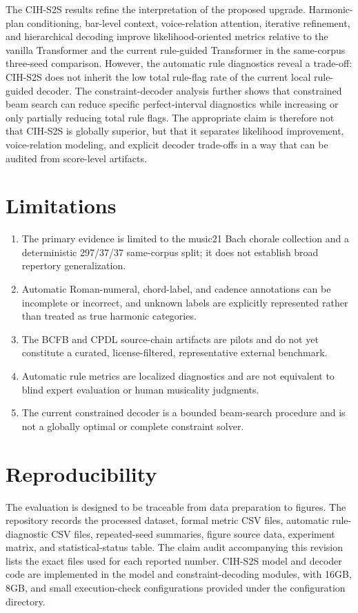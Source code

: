 \documentclass[11pt]{article}
\begin{document}
The CIH-S2S results refine the interpretation of the proposed upgrade. Harmonic-plan conditioning, bar-level context, voice-relation attention, iterative refinement, and hierarchical decoding improve likelihood-oriented metrics relative to the vanilla Transformer and the current rule-guided Transformer in the same-corpus three-seed comparison. However, the automatic rule diagnostics reveal a trade-off: CIH-S2S does not inherit the low total rule-flag rate of the current local rule-guided decoder. The constraint-decoder analysis further shows that constrained beam search can reduce specific perfect-interval diagnostics while increasing or only partially reducing total rule flags. The appropriate claim is therefore not that CIH-S2S is globally superior, but that it separates likelihood improvement, voice-relation modeling, and explicit decoder trade-offs in a way that can be audited from score-level artifacts.

\section{Limitations}

\begin{enumerate}
\item The primary evidence is limited to the music21 Bach chorale collection and a deterministic 297/37/37 same-corpus split; it does not establish broad repertory generalization.
\item Automatic Roman-numeral, chord-label, and cadence annotations can be incomplete or incorrect, and unknown labels are explicitly represented rather than treated as true harmonic categories.
\item The BCFB and CPDL source-chain artifacts are pilots and do not yet constitute a curated, license-filtered, representative external benchmark.
\item Automatic rule metrics are localized diagnostics and are not equivalent to blind expert evaluation or human musicality judgments.
\item The current constrained decoder is a bounded beam-search procedure and is not a globally optimal or complete constraint solver.
\end{enumerate}

\section{Reproducibility}

The evaluation is designed to be traceable from data preparation to figures. The repository records the processed dataset, formal metric CSV files, automatic rule-diagnostic CSV files, repeated-seed summaries, figure source data, experiment matrix, and statistical-status table. The claim audit accompanying this revision lists the exact files used for each reported number. CIH-S2S model and decoder code are implemented in the model and constraint-decoding modules, with 16GB, 8GB, and small execution-check configurations provided under the configuration directory.
\end{document}
